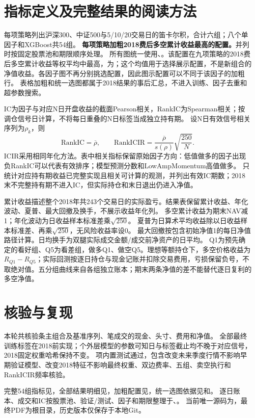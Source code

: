 \documentclass[10pt,compsoc,UTF8]{CjC}
\begin{document}
\clearpage
\section{指标定义及完整结果的阅读方法}
每项策略列出沪深300、中证500与5/10/20交易日的笛卡尔积，合计六组；八个单因子和XGBoost共54组。
\textbf{每项策略加粗2018费后多空累计收益最高的配置。}并列时按固定股票池和期限顺序处理。
所有图统一使用\PlotPool、\PlotPeriod。该配置在九项策略的2018费后多空累计收益等权平均中最高，为\PlotMeanTotal；这个均值用于选择展示配置，不是新组合的净值收益。各因子图不再分别挑选配置，因此图示配置可以不同于该因子的加粗行。
表格加粗和统一选图都属于2018结果的事后汇总，不进入训练、因子去重和超参数搜索。

IC为因子与对应N日开盘收益的截面Pearson相关，RankIC为Spearman相关；按调仓信号日计算，不将每日重叠的N日标签当成独立持有期。
设N日有效信号相关序列为$\rho_k$，则
\[
\mathrm{RankIC}=\overline{\rho},\qquad
\mathrm{RankICIR}=\frac{\overline{\rho}}{s(\rho)}\sqrt{\frac{250}{N}}.
\]
ICIR采用相同年化方法。表中相关指标保留原始因子方向：低值做多的因子出现负RankIC可以代表有效排序；模型预测分数和LowAmpMomentum高值做多。
只统计对应持有期收益已完整实现且相关可计算的观测，并列出有效IC期数；2018末不完整持有期不进入IC，但实际持仓和末日退出仍进入净值。

累计收益描述整个2018年共243个交易日的实际盈亏。结果表保留累计收益、年化波动、夏普、最大回撤及换手，不展示收益年化列。
多空累计收益为期末NAV减1；年化波动为日收益样本标准差乘$\sqrt{250}$。
夏普为日算术平均收益除以日收益样本标准差、再乘$\sqrt{250}$，无风险收益率设0。
最大回撤按包含初始净值1的每日净值路径计算。日均换手为双腿实际成交金额/成交前净资产的日平均。
Q1为预先确定的看好组、Q5为看差组，做多Q1、做空Q5。理想等额持仓下，多空价格收益为$R_{Q1}-R_{Q5}$；实际回测按逐日持仓与现金记账并扣除交易费用，亏损保留负号，不取绝对值。五分组曲线来自各组独立账本；期末两条净值的差不能替代逐日复利的多空净值。



\clearpage
\section{核验与复现}
本轮共核验\Series 条主组合及基准序列、\Trades 笔成交的现金、头寸、费用和净值。
全部最终训练标签在2018前实现；\ValidationModels 个外层模型的参数可知日与标签截止均不晚于对应信号，2018固定权重哈希保持不变。
\Tests 项内置测试通过，包含改变未来季度行情不影响早期验证模型、改变2018特征不影响最终权重、双边费率、五组、卖空执行和RankICIR频率核验。

完整54组指标见，全部结果明细见，加粗配置见，统一选图依据见和。
逐日账本、成交和IC按股票池、验证/测试、因子和期限整理于、。
当前唯一源码为，最终PDF为根目录，历史版本仅保存于本地Git。
\end{document}
